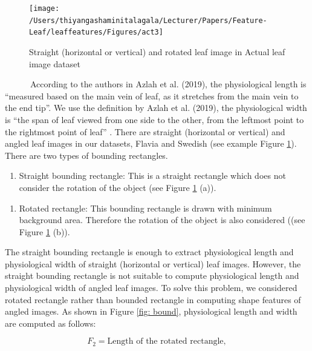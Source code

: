 \documentclass{article}
\begin{document}
\begin{figure}[!ht]

{\centering \texttt{[image: /Users/thiyangashaminitalagala/Lecturer/Papers/Feature-Leaf/leaffeatures/Figures/act3]} 

}

\caption{\label{act3}Straight (horizontal or vertical) and rotated leaf image in Actual leaf image dataset}\label{fig:act3}
\end{figure}

~~~~~~According to the authors in Azlah et al. (2019), the physiological
length is ``measured based on the main vein of leaf, as it stretches
from the main vein to the end tip''. We use the definition by Azlah et
al. (2019), the physiological width is ``the span of leaf viewed from
one side to the other, from the leftmost point to the rightmost point of
leaf'' . There are straight (horizontal or vertical) and angled leaf
images in our datasets, Flavia and Swedish (see example Figure
\ref{fig:act3}). There are two types of bounding rectangles.

\begin{enumerate}
\def\labelenumi{\roman{enumi})}
\tightlist
\item
  Straight bounding rectangle: This is a straight rectangle which does
  not consider the rotation of the object (see Figure \ref{fig:act3}
  (a)).
\end{enumerate}

\begin{enumerate}
\def\labelenumi{\roman{enumi})}
\setcounter{enumi}{1}
\tightlist
\item
  Rotated rectangle: This bounding rectangle is drawn with minimum
  background area. Therefore the rotation of the object is also
  considered ((see Figure \ref{fig:act3} (b)).
\end{enumerate}

The straight bounding rectangle is enough to extract physiological
length and physiological width of straight (horizontal or vertical) leaf
images. However, the straight bounding rectangle is not suitable to
compute physiological length and physiological width of angled leaf
images. To solve this problem, we considered rotated rectangle rather
than bounded rectangle in computing shape features of angled images. As
shown in Figure \ref{fig: bound}, physiological length and width are
computed as follows:

\begin{equation}
   F_2 = \text{Length of the rotated rectangle},
\label{equa_F2}
\end{equation}
\end{document}
